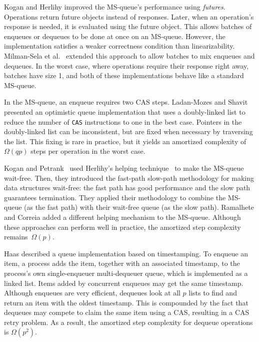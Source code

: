 Kogan and Herlihy \cite{DBLP:conf/podc/KoganH14} improved the MS-queue's performance using \emph{futures}.
Operations return future
objects instead of responses. Later, when an operation's response is needed, it
is evaluated using the future object.
This allows batches of enqueues or dequeues to be done at once on an MS-queue.
However, the implementation satisfies a weaker correctness condition than linearizability.
Milman-Sela et al.~\cite{MKLLP22} extended this approach to allow batches
to mix enqueues and dequeues.
In the worst case, where operations require their response right away,
batches have size 1, and both of these implementations behave like a standard MS-queue.

In the MS-queue, an enqueue requires two CAS steps.
Ladan-Mozes and Shavit~\cite{DBLP:journals/dc/Ladan-MozesS08}
presented an optimistic  queue implementation
that uses a doubly-linked list to reduce the number of
\texttt{CAS} instructions to one in the best case. 
Pointers in the doubly-linked list can be inconsistent, but are fixed when necessary by traversing the list.
This fixing is rare in practice, but it yields an amortized complexity of $\Omega(qp)$ 
steps per operation in the worst case.

Kogan and Petrank~\cite{DBLP:conf/ppopp/KoganP11} 
used Herlihy's helping
technique~\cite{10.1145/114005.102808} to make the MS-queue
wait-free.
Then, they introduced the 
fast-path slow-path methodology \cite{10.1145/2370036.2145835} for making data structures wait-free:
the fast path has good performance and the slow path guarantees termination.
They applied their methodology to combine the MS-queue (as the fast path)
with their wait-free queue (as the slow path).
Ramalhete and Correia \cite{RC17} added a different helping mechanism to the MS-queue.
Although these approaches can perform well in practice,
the amortized step complexity remains~$\Omega(p)$. 

Haas \cite{Haa15} described a queue implementation based on timestamping.
To enqueue an item, a process adds the item, together with an associated timestamp,
to the process's own single-enqueuer multi-dequeuer queue, which is implemented as a linked list.  
Items added by concurrent enqueues may get the same timestamp.
Although enqueues are very efficient, dequeues look at all $p$ lists
to find and return an item with the oldest timestamp.
This is compounded by the fact that dequeues may compete to claim the same item using a CAS, resulting
in a CAS retry problem.  As a result, the amortized step complexity for dequeue operations
is $\Omega(p^2)$.

